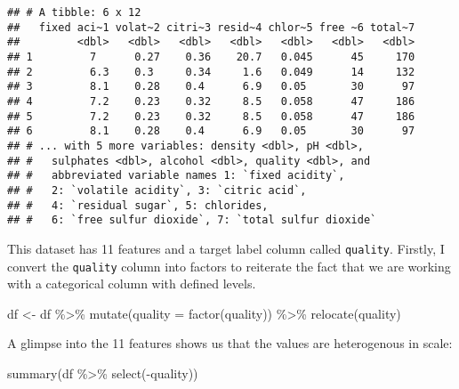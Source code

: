 \documentclass[
]{book}
\newenvironment{Shaded}{\begin{snugshade}}{\end{snugshade}}
\newcommand{\AttributeTok}[1]{\textcolor[rgb]{0.77,0.63,0.00}{#1}}
\newcommand{\FunctionTok}[1]{\textcolor[rgb]{0.00,0.00,0.00}{#1}}
\newcommand{\NormalTok}[1]{#1}
\newcommand{\OtherTok}[1]{\textcolor[rgb]{0.56,0.35,0.01}{#1}}
\newcommand{\SpecialCharTok}[1]{\textcolor[rgb]{0.00,0.00,0.00}{#1}}
\begin{document}
\begin{verbatim}
## # A tibble: 6 x 12
##   fixed aci~1 volat~2 citri~3 resid~4 chlor~5 free ~6 total~7
##         <dbl>   <dbl>   <dbl>   <dbl>   <dbl>   <dbl>   <dbl>
## 1         7      0.27    0.36    20.7   0.045      45     170
## 2         6.3    0.3     0.34     1.6   0.049      14     132
## 3         8.1    0.28    0.4      6.9   0.05       30      97
## 4         7.2    0.23    0.32     8.5   0.058      47     186
## 5         7.2    0.23    0.32     8.5   0.058      47     186
## 6         8.1    0.28    0.4      6.9   0.05       30      97
## # ... with 5 more variables: density <dbl>, pH <dbl>,
## #   sulphates <dbl>, alcohol <dbl>, quality <dbl>, and
## #   abbreviated variable names 1: `fixed acidity`,
## #   2: `volatile acidity`, 3: `citric acid`,
## #   4: `residual sugar`, 5: chlorides,
## #   6: `free sulfur dioxide`, 7: `total sulfur dioxide`
\end{verbatim}

This dataset has 11 features and a target label column called \texttt{quality}. Firstly, I convert the \texttt{quality} column into factors to reiterate the fact that we are working with a categorical column with defined levels.

\begin{Shaded}
\begin{Highlighting}[]
\NormalTok{df }\OtherTok{\textless{}{-}}\NormalTok{ df }\SpecialCharTok{\%\textgreater{}\%} \FunctionTok{mutate}\NormalTok{(}\AttributeTok{quality =} \FunctionTok{factor}\NormalTok{(quality)) }\SpecialCharTok{\%\textgreater{}\%} \FunctionTok{relocate}\NormalTok{(quality)}
\end{Highlighting}
\end{Shaded}

A glimpse into the 11 features shows us that the values are heterogenous in scale:

\begin{Shaded}
\begin{Highlighting}[]
\FunctionTok{summary}\NormalTok{(df }\SpecialCharTok{\%\textgreater{}\%} \FunctionTok{select}\NormalTok{(}\SpecialCharTok{{-}}\NormalTok{quality))}
\end{Highlighting}
\end{Shaded}
\end{document}
